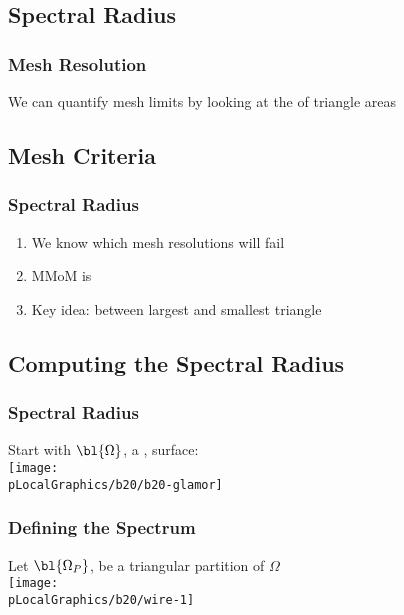 \newcommand{\passed}[0]		{\begin{center}{
\tiny{\texttt{\dg{--------------------------------------------------------------------------------}}} \\
\tiny{\texttt{\dg{\phantom{----}---| Mercury MOM Completed }\bl{Sucessfully}\dg{ |---}}} \\
\tiny{\texttt{\dg{--------------------------------------------------------------------------------}}}}
\end{center}}

\subsection{Spectral Radius}

\begin{frame}
	\frametitle{Mesh Resolution}
	We can quantify mesh limits by looking at the  of triangle areas
\end{frame}

\subsection{Mesh Criteria}
\begin{frame}
	\frametitle{Spectral Radius}
	\begin{enumerate}
		\item We know  which mesh resolutions will fail
		\item MMoM is 
		\item Key idea:  between largest and smallest triangle
	\end{enumerate}
\end{frame}


\subsection{Computing the Spectral Radius}
\begin{frame}
	\frametitle{Spectral Radius}
	Start with $\bl{\Omega}$, a ,  surface:\\[10pt]
	\centering
	\raisebox{2cm}{$\bl{\Omega} = $} \texttt{[image: \\pLocalGraphics/b20/b20-glamor]}
\end{frame}

\begin{frame}
	\frametitle{Defining the Spectrum}
	Let $\bl{\Omega_{P}}$, be a triangular partition of $\Omega$\\[10pt]
	\centering
	\texttt{[image: \\pLocalGraphics/b20/wire-1]}
\end{frame}

